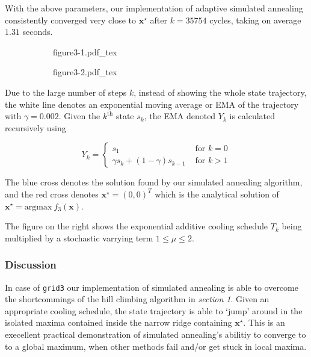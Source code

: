 \documentclass[11pt,oneside]{article}
\newcommand{\vect}[1]{\boldsymbol{#1}}
\begin{document}
With the above parameters, our implementation of adaptive simulated annealing 
consistently converged
very close to $\vect{x}^\star$ after $k=35754$ cycles, taking on average $1.31$ seconds.

\begin{figure}[h!]
    \caption{Simulated annealing with adaptive exponential cooling schedule}
    \centering
    \begin{subfigure}{0.5\textwidth}%
        \centering
        \def\svgwidth{\textwidth}
        {figure3-1.pdf_tex}
    \end{subfigure}%
    \begin{subfigure}{0.5\textwidth}%
        \centering
        \def\svgwidth{\textwidth}
        {figure3-2.pdf_tex}
    \end{subfigure}%
\end{figure}

Due to the large number of steps $k$, instead of showing the whole state trajectory,
the white line denotes an exponential moving average or EMA of the trajectory with 
$\gamma=0.002$. Given the $k^{\mathrm{th}}$ state $s_k$, the EMA denoted $Y_k$ 
is calculated recursively using

\begin{equation}
    Y_k = \begin{cases}
        s_1    & \text{ for } k = 0 \\
        \gamma s_k + (1-\gamma)s_{k-1} & \text{ for } k > 1
    \end{cases}
\end{equation}

The blue cross denotes the solution found by our simulated annealing algorithm, and the
red cross denotes $\vect{x}^\star = (0,0)^T$ which is the analytical solution of
$\vect{x}^\star =
    \mathrm{argmax}\:
    f_3(\vect{x})$.     

The figure on the right shows the exponential additive cooling schedule $T_k$
being multiplied by a stochastic varrying term $1\leq \mu \leq 2$.

\subsubsection{Discussion}

In case of \texttt{grid3} our implementation of simulated annealing is able to overcome
the shortcommings of the hill climbing algorithm in \emph{section 1}. Given an appropriate
cooling schedule, the state trajectory is able to `jump' around in the isolated maxima
contained inside the narrow ridge containing $\vect{x}^\star$. This is an execellent
practical demonstration of simulated annealing's abilitiy to converge to to a global
maximum, when other methods fail and/or get stuck in local maxima.
\end{document}
